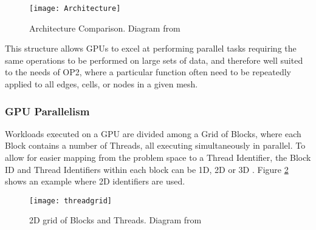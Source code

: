 \begin{figure}[h]
  \centering
  \texttt{[image: Architecture]}
  \caption{\label{fig:arch} Architecture Comparison. Diagram from \cite[p3]{guide}}
\end{figure}

\par
This structure allows GPUs to excel at performing parallel tasks requiring the same operations to be performed on large sets of data, and therefore well suited to the needs of OP2, where a particular function often need to be repeatedly applied to all edges, cells, or nodes in a given mesh.

\subsubsection{GPU Parallelism}
Workloads executed on a GPU are divided among a Grid of Blocks, where each Block contains a number of Threads, all executing simultaneously in parallel. To allow for easier mapping from the problem space to a Thread Identifier, the Block ID and Thread Identifiers within each block can be 1D, 2D or 3D \cite[p9]{guide}. Figure \ref{fig:threadgrid} shows an example where 2D identifiers are used.

\begin{figure}[h!]
  \centering
  \texttt{[image: threadgrid]}
  \caption{\label{fig:threadgrid} 2D grid of Blocks and Threads. Diagram from \cite[p9]{guide}}
\end{figure}

